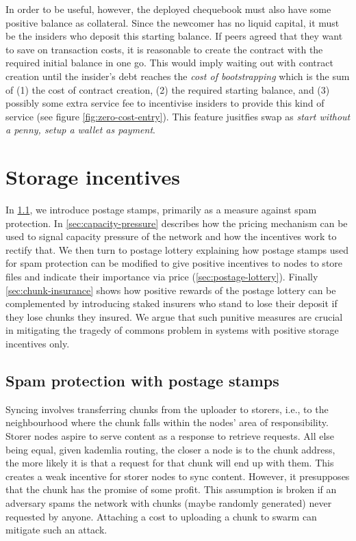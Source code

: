 In order to be useful, however, the deployed chequebook must also have some positive balance as collateral. Since the newcomer has no liquid capital, it must be the insiders who deposit this starting balance. If peers agreed that they want to save on transaction costs, it is reasonable to create the contract with the required initial balance in one go. This would imply waiting out with contract creation until the insider's debt reaches the \emph{cost of bootstrapping} which is the sum of (1) the cost of contract creation, (2) the required starting balance, and (3) possibly some extra service fee to incentivise insiders to provide this kind of service (see figure \ref{fig:zero-cost-entry}). This feature jusitfies swap as \emph{start without a penny, setup a wallet as payment}.

\section{Storage incentives}\label{sec:storage-incentives}

In \ref{sec:postage-stamps}, we introduce postage stamps, primarily as a measure against spam protection. In \ref{sec:capacity-pressure} describes how the pricing mechanism can be used to signal capacity pressure of the network and how the incentives work to rectify that. 
We then turn to postage lottery explaining how postage stamps used for spam protection can be modified to give positive incentives to nodes to store files and indicate their importance via price (\ref{sec:postage-lottery}). Finally \ref{sec:chunk-insurance} shows how positive rewards of the postage lottery can be complemented by introducing staked insurers who stand to lose their deposit if they lose chunks they insured. We argue that such punitive measures are crucial in mitigating the tragedy of commons problem in systems with positive storage incentives only. 

\subsection{Spam protection with postage stamps}\label{sec:postage-stamps}

Syncing involves transferring chunks from the uploader to storers, i.e., to the neighbourhood where the chunk falls within the nodes' area of responsibility. Storer nodes aspire to serve content as a response to retrieve requests. All else being equal, given kademlia routing, the closer a node is to the chunk address, the more likely it is that a request for that chunk will end up with them. This creates a weak incentive for storer nodes to sync content. However, it presupposes that the chunk has the promise of some profit. This assumption is broken if an adversary spams the network with chunks (maybe randomly generated) never requested by anyone. Attaching a cost to uploading a chunk to swarm can mitigate such an attack. 


